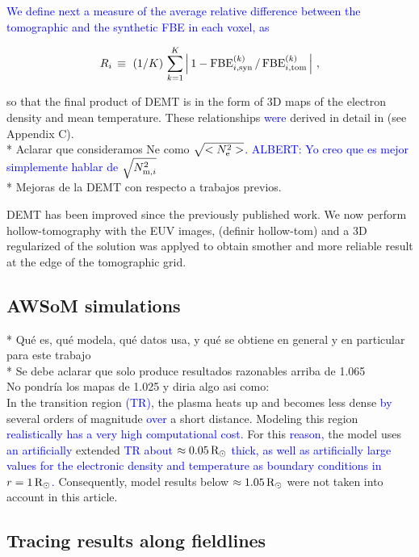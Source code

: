 \documentclass[namedreferences]{solarphysics}
\newcommand{\mrsun}{{\rm R_\odot}}
\newcommand{\FBE}{{\rm FBE}}
\newcommand{\Ne}{N_{\rm e}}
\newcommand{\Nsqmi}{N^2_{{\rm m},i}}
\newcommand{\sqravgN}{\sqrt{\Nsqmi}}
\def\albert#1{\textcolor{blue}{#1}}
\def\temp#1{\textcolor{mygray}{#1}}
\begin{document}
\begin{article}
\albert{We define next a measure of the average relative difference between the tomographic and the synthetic FBE in each voxel, as}

\begin{equation}\label{R}
R_i \, \equiv \ (1/K) \, \sum_{k=1}^K \left| \, 1 - \FBE^{(k)}_{i,\rm syn}\,/\,\FBE^{(k)}_{i,\rm tom}\, \right| \,,
\end{equation}

so that the final product of DEMT is in the form of 3D maps of the electron density and mean temperature. These relationships \albert{were} derived in detail in \citealt{frazin_2009} (see Appendix C).\\
\temp{* Aclarar que consideramos Ne como $\sqrt{<\Ne ^2>}$.} \albert{ALBERT: Yo creo que es mejor simplemente hablar de $\sqravgN$}\\
\temp{* Mejoras de la DEMT con respecto a trabajos previos}.

\temp{DEMT has been improved since the previously published work. We now perform hollow-tomography with the EUV images, (definir hollow-tom) and a 3D regularized of the solution was applyed to obtain smother and more reliable result at the edge of the tomographic grid.}

\subsection{AWSoM simulations}\label{awsom} 
\temp{* Qué es, qué modela, qué datos usa, y qué se obtiene en general y en particular para este trabajo}\\
\temp{* Se debe aclarar que solo produce resultados razonables arriba de 1.065}\\
\temp{No pondría los mapas de 1.025 y diria algo asi como:}\\
In the transition region \albert{(TR)}, the plasma heats up and becomes less dense \albert{by} several orders of magnitude \albert{over} a short distance. Modeling this region \albert{realistically has a very high computational cost}. For this \albert{reason,} the model uses \albert{an artificially} extended \albert{TR about $\approx 0.05\,\mrsun$ thick, as well as artificially large values for the electronic density and temperature as boundary conditions in $r=1\,\mrsun$.} Consequently, model results below \albert{$\approx 1.05\,\mrsun$} were not taken into account in this article.

\subsection{Tracing results along fieldlines}\label{trace} 


\end{article}
\end{document}
